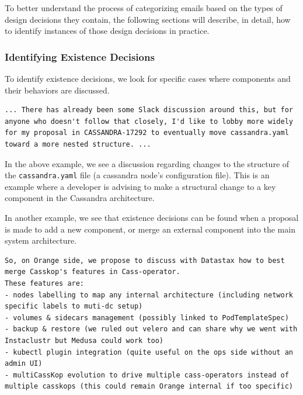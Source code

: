 \documentclass[a4paper, 12pt]{article}
\begin{document}
		To better understand the process of categorizing emails based on the types of design decisions they contain, the following sections will describe, in detail, how to identify instances of those design decisions in practice.
		
		\subsubsection{Identifying \textbf{Existence} Decisions}
			To identify existence decisions, we look for specific cases where components and their behaviors are discussed.
			\begin{verbatim}
... There has already been some Slack discussion around this, but for anyone who doesn't follow that closely, I'd like to lobby more widely for my proposal in CASSANDRA-17292 to eventually move cassandra.yaml toward a more nested structure. ...
			\end{verbatim}
			In the above example, we see a discussion regarding changes to the structure of the \texttt{cassandra.yaml} file (a cassandra node's configuration file). This is an example where a developer is advising to make a structural change to a key component in the Cassandra architecture.
			
			In another example, we see that existence decisions can be found when a proposal is made to add a new component, or merge an external component into the main system architecture.
			\begin{verbatim}
So, on Orange side, we propose to discuss with Datastax how to best merge Casskop's features in Cass-operator.
These features are:
- nodes labelling to map any internal architecture (including network specific labels to muti-dc setup)
- volumes & sidecars management (possibly linked to PodTemplateSpec)
- backup & restore (we ruled out velero and can share why we went with Instaclustr but Medusa could work too)
- kubectl plugin integration (quite useful on the ops side without an admin UI)
- multiCassKop evolution to drive multiple cass-operators instead of multiple casskops (this could remain Orange internal if too specific)
			\end{verbatim}
			
\end{document}

